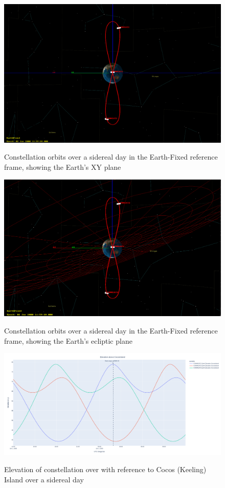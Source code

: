 \documentclass[12pt]{article}
\begin{document}
\begin{figure}[H]
    \centering
    \includegraphics[width=\linewidth]{figures/EarthFixedXY.png}\\
    \caption{Constellation orbits over a sidereal day in the Earth-Fixed reference frame, showing the Earth's XY plane}
    \label{fig:fixed_xy}
\end{figure}
\begin{figure}[H]
    \centering
    \includegraphics[width=\linewidth]{figures/EarthFixedEcliptic.png}\\
    \caption{Constellation orbits over a sidereal day in the Earth-Fixed reference frame, showing the Earth's ecliptic plane}
    \label{fig:fixed_ecliptic}
\end{figure}
\begin{figure}[H]
    \centering
    \includegraphics[width=\linewidth]{figures/CocosElevation.png}\\
    \caption{Elevation of constellation over with reference to Cocos (Keeling) Island  over a sidereal day}
    \label{fig:cocos_elevation}
\end{figure}
\end{document}
